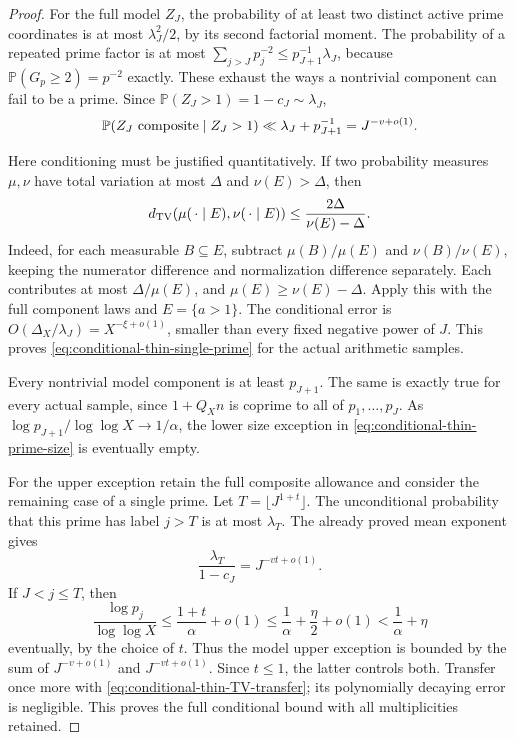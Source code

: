 \documentclass[11pt]{article}
\theoremstyle{definition}
\begin{document}
\begin{proof}
For the full model $Z_J$, the probability of at least two
distinct active prime coordinates is at most $\lambda_J^2/2$,
by its second factorial moment.
The probability of a repeated prime factor is at most
$\sum_{j>J}p_j^{-2}\le p_{J+1}^{-1}\lambda_J$,
because $\mathbb P(G_p\ge2)=p^{-2}$ exactly.
These exhaust the ways a nontrivial component can fail to
be a prime.  Since $\mathbb P(Z_J>1)=1-c_J\sim\lambda_J$,
\begin{equation}
 \mathbb P(Z_J\ {\rm composite}\mid Z_J>1)
       \ll\lambda_J+p_{J+1}^{-1}
       =J^{-v+o(1)}.
 \label{eq:conditional-thin-composite-allowance}
\end{equation}

Here conditioning must be justified quantitatively.
If two probability measures $\mu,\nu$ have total variation
at most $\Delta$ and $\nu(E)>\Delta$, then
\begin{equation}
 d_{\rm TV}(\mu(\,\cdot\mid E),\nu(\,\cdot\mid E))
       \le\frac{2\Delta}{\nu(E)-\Delta}.
 \label{eq:conditional-thin-TV-transfer}
\end{equation}
Indeed, for each measurable $B\subseteq E$, subtract
$\mu(B)/\mu(E)$ and $\nu(B)/\nu(E)$, keeping the numerator
difference and normalization difference separately.
Each contributes at most $\Delta/\mu(E)$, and
$\mu(E)\ge\nu(E)-\Delta$.
Apply this with the full component laws and $E=\{a>1\}$.
The conditional error is
$O(\Delta_X/\lambda_J)=X^{-\xi+o(1)}$, smaller than every
fixed negative power of $J$.
This proves \eqref{eq:conditional-thin-single-prime} for
the actual arithmetic samples.

Every nontrivial model component is at least $p_{J+1}$.
The same is exactly true for every actual sample, since
$1+Q_Xn$ is coprime to all of $p_1,\ldots,p_J$.
As $\log p_{J+1}/\log\log X\to1/\alpha$, the lower
size exception in \eqref{eq:conditional-thin-prime-size}
is eventually empty.

For the upper exception retain the full composite allowance
and consider the remaining case of a single prime.
Let $T=\lfloor J^{1+t}\rfloor$.
The unconditional probability that this prime has label
$j>T$ is at most $\lambda_T$.
The already proved mean exponent gives
\[
 \frac{\lambda_T}{1-c_J}
       =J^{-vt+o(1)}.
\]
If $J<j\le T$, then
\[
 \frac{\log p_j}{\log\log X}
       \le\frac{1+t}{\alpha}+o(1)
       \le\frac1\alpha+\frac\eta2+o(1)
       <\frac1\alpha+\eta
\]
eventually, by the choice of $t$.
Thus the model upper exception is bounded by the sum of
$J^{-v+o(1)}$ and $J^{-vt+o(1)}$.
Since $t\le1$, the latter controls both.
Transfer once more with
\eqref{eq:conditional-thin-TV-transfer}; its polynomially
decaying error is negligible.
This proves the full conditional bound with all multiplicities
retained.
\end{proof}
\end{document}
